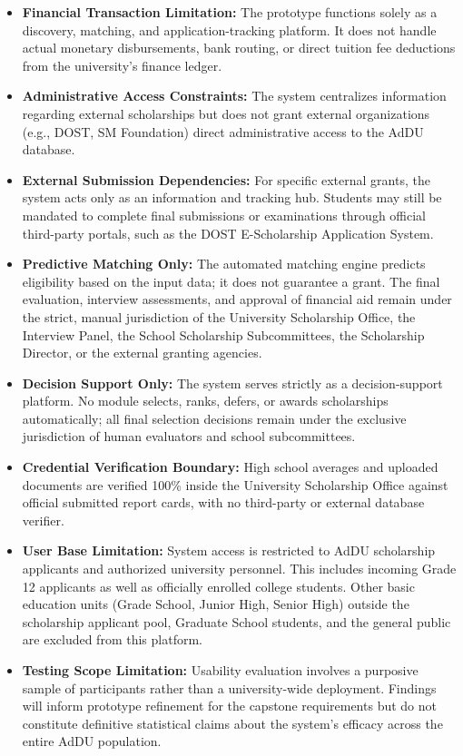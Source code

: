 \begin{itemize}
  \item \textbf{Financial Transaction Limitation:} The prototype functions solely as a discovery, matching, and application-tracking platform. It does not handle actual monetary disbursements, bank routing, or direct tuition fee deductions from the university's finance ledger.
  \item \textbf{Administrative Access Constraints:} The system centralizes information regarding external scholarships but does not grant external organizations (e.g., DOST, SM Foundation) direct administrative access to the AdDU database.
  \item \textbf{External Submission Dependencies:} For specific external grants, the system acts only as an information and tracking hub. Students may still be mandated to complete final submissions or examinations through official third-party portals, such as the DOST E-Scholarship Application System.
  \item \textbf{Predictive Matching Only:} The automated matching engine predicts eligibility based on the input data; it does not guarantee a grant. The final evaluation, interview assessments, and approval of financial aid remain under the strict, manual jurisdiction of the University Scholarship Office, the Interview Panel, the School Scholarship Subcommittees, the Scholarship Director, or the external granting agencies.
  \item \textbf{Decision Support Only:} The system serves strictly as a decision-support platform. No module selects, ranks, defers, or awards scholarships automatically; all final selection decisions remain under the exclusive jurisdiction of human evaluators and school subcommittees.
  \item \textbf{Credential Verification Boundary:} High school averages and uploaded documents are verified 100\% inside the University Scholarship Office against official submitted report cards, with no third-party or external database verifier.
  \item \textbf{User Base Limitation:} System access is restricted to AdDU scholarship applicants and authorized university personnel. This includes incoming Grade 12 applicants as well as officially enrolled college students. Other basic education units (Grade School, Junior High, Senior High) outside the scholarship applicant pool, Graduate School students, and the general public are excluded from this platform.
  \item \textbf{Testing Scope Limitation:} Usability evaluation involves a purposive sample of participants rather than a university-wide deployment. Findings will inform prototype refinement for the capstone requirements but do not constitute definitive statistical claims about the system's efficacy across the entire AdDU population.

\end{itemize}
